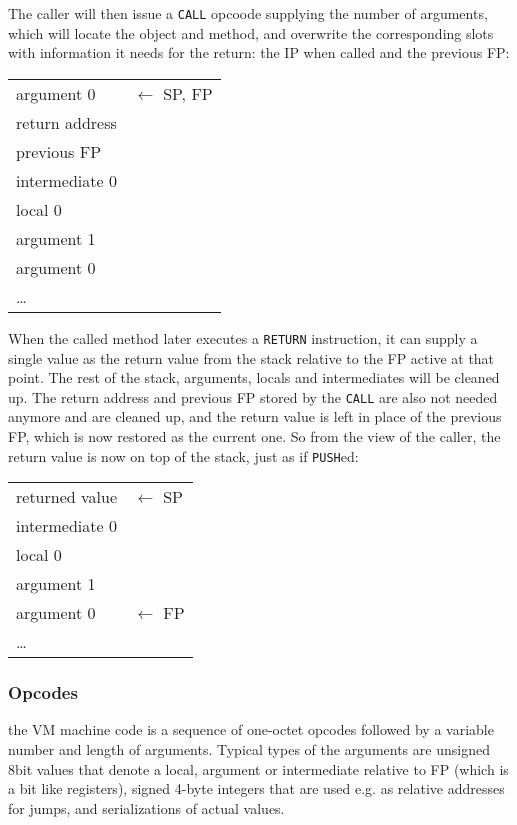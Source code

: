 \documentclass[12pt,a4paper]{article}
\begin{document}
The caller will then issue a \verb|CALL| opcoode supplying the number of arguments, which will locate the object and method, and overwrite the corresponding slots with information it needs for the return: the IP when called and the previous FP:

\begin{table}[H]
\centering
\begin{tabular}{|p{3cm}|p{3cm}}
argument 0 & $\leftarrow$ SP, FP \\
\cline{1-1}
return address \\
previous FP \\
intermediate 0 \\
local 0    \\    
argument 1 \\
argument 0 \\
\cline{1-1}
\ldots & \\
\end{tabular}
\end{table}

When the called method later executes a \verb|RETURN| instruction, it can supply a single value as the return value from the stack relative to the FP active at that point. The rest of the stack, arguments, locals and intermediates will be cleaned up. The return address and previous FP stored by the \verb|CALL| are also not needed anymore and are cleaned up, and the return value is left in place of the previous FP, which is now restored as the current one. So from the view of the caller, the return value is now on top of the stack, just as if \verb|PUSH|ed:

\begin{table}[H]
\centering
\begin{tabular}{|p{3cm}|p{3cm}}
returned value & $\leftarrow$ SP \\
intermediate 0 \\
local 0    \\    
argument 1 \\
argument 0 & $\leftarrow$ FP \\ 
\cline{1-1}
\ldots & \\
\end{tabular}
\end{table}

\subsubsection{Opcodes}\label{sec:opcodes}

the VM machine code is a sequence of one-octet opcodes followed by a variable number and length of arguments. Typical types of the arguments are unsigned 8bit values that denote a local, argument or intermediate relative to FP (which is a bit like registers), signed 4-byte integers that are used e.g. as relative addresses for jumps, and serializations of actual values.
\end{document}
